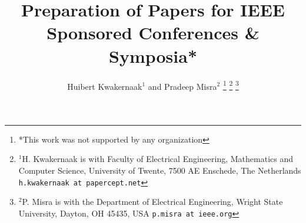 \title{\LARGE \bf
  Preparation of Papers for IEEE Sponsored Conferences \& Symposia*
}


\author{Huibert Kwakernaak$^{1}$ and Pradeep Misra$^{2}$%
  \thanks{*This work was not supported by any organization}%
  \thanks{$^{1}$H. Kwakernaak is with Faculty of Electrical Engineering, Mathematics and Computer Science,
    University of Twente, 7500 AE Enschede, The Netherlands
      {\tt\small h.kwakernaak at papercept.net}}%
  \thanks{$^{2}$P. Misra is with the Department of Electrical Engineering, Wright State University,
    Dayton, OH 45435, USA
      {\tt\small p.misra at ieee.org}}%
}